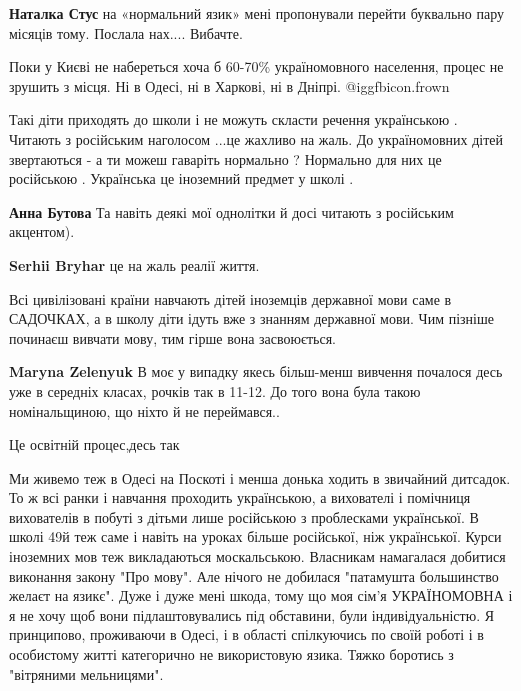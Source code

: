 \begin{itemize}
\begin{itemize}
\textbf{Наталка Стус} на «нормальний язик» мені пропонували перейти буквально пару місяців тому. Послала нах.... Вибачте.
\end{itemize} %

Поки у Києві не набереться хоча б 60-70\% україномовного населення, процес не
зрушить з місця. Ні в Одесі, ні в Харкові, ні в Дніпрі.  @igg{fbicon.frown} 


Такі діти приходять до школи і не можуть скласти речення українською . Читають
з російським наголосом ...це жахливо на жаль. До україномовних дітей
звертаються - а ти можеш гаваріть нормально ? Нормально для них це російською .
Українська це іноземний предмет у школі .

\begin{itemize} %
\textbf{Анна Бутова} Та навіть деякі мої однолітки й досі читають з російським акцентом).

\textbf{Serhii Bryhar} це на жаль реалії життя.
\end{itemize} %


Всі цивілізовані країни навчають дітей іноземців державної мови саме в
САДОЧКАХ, а в школу діти ідуть вже з знанням державної мови. Чим пізніше
починаєш вивчати мову, тим гірше вона засвоюється.

\begin{itemize} %
\textbf{Maryna Zelenyuk} В моє у випадку якесь більш-менш вивчення почалося десь уже в середніх класах, рочків так в 11-12. До того вона була такою номінальщиною, що ніхто й не переймався..
\end{itemize} %

Це освітній процес,десь так


Ми живемо теж в Одесі на Поскоті і менша донька ходить в звичайний дитсадок. То
ж всі ранки і навчання проходить українською, а вихователі і помічниця
вихователів в побуті з дітьми лише російською з проблесками української. В
школі 49й теж саме і навіть на уроках більше російської, ніж української. Курси
іноземних мов теж викладаються москальською. Власникам намагалася добитися
виконання закону "Про мову". Але нічого не добилася "патамушта большинство
желаєт на язикє". Дуже і дуже мені шкода, тому що моя сім'я УКРАЇНОМОВНА і я не
хочу щоб вони підлаштовувались під обставини, були індивідуальністю. Я
принципово, проживаючи в Одесі, і в області спілкуючись по своїй роботі і в
особистому житті категорично не використовую язика. Тяжко боротись з "вітряними
мельницями".


\end{itemize}

